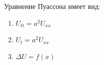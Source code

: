 Уравнение Пуассона имеет вид:

\begin{enumerate}[label=\arabic*)]
    \item \(U_{tt}=a^2U_{xx}\)
    \item \(U_t=a^2U_{xx}\)
    \item \(\Delta U=f(x)\)
\end{enumerate}


